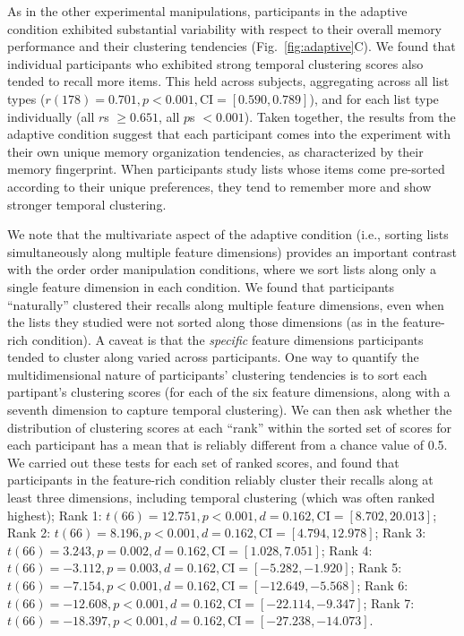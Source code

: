 \documentclass[11pt]{article}
\begin{document}
As in the other experimental manipulations, participants in the adaptive
condition exhibited substantial variability with respect to their overall
memory performance and their clustering tendencies (Fig.~\ref{fig:adaptive}C).
We found that individual participants who exhibited strong temporal clustering
scores also tended to recall more items. This held across subjects, aggregating
across all list types ($r(178) = 0.701, p < 0.001, \mathrm{CI} = [0.590,
0.789]$), and for each list type individually (all $r$s $\geq 0.651$, all $p$s
$< 0.001$). Taken together, the results from the adaptive condition suggest
that each participant comes into the experiment with their own unique memory
organization tendencies, as characterized by their memory fingerprint. When
participants study lists whose items come pre-sorted according to their unique
preferences, they tend to remember more and show stronger temporal clustering.

We note that the multivariate aspect of the adaptive condition (i.e., sorting
lists simultaneously along multiple feature dimensions) provides an important
contrast with the order order manipulation conditions, where we sort lists
along only a single feature dimension in each condition. We found that
participants ``naturally'' clustered their recalls along multiple feature
dimensions, even when the lists they studied were not sorted along those
dimensions (as in the feature-rich condition). A caveat is that the
\textit{specific} feature dimensions participants tended to cluster along
varied across participants. One way to quantify the multidimensional nature of
participants' clustering tendencies is to sort each partipant's clustering
scores (for each of the six feature dimensions, along with a seventh dimension
to capture temporal clustering). We can then ask whether the distribution of
clustering scores at each ``rank'' within the sorted set of scores for each
participant has a mean that is reliably different from a chance value of 0.5.
We carried out these tests for each set of ranked scores, and found that
participants in the feature-rich condition reliably cluster their recalls along
at least three dimensions, including temporal clustering (which was often
ranked highest); Rank 1: $t(66) = 12.751, p < 0.001, d = 0.162, \mathrm{CI} =
[8.702, 20.013]$; Rank 2: $t(66) = 8.196, p < 0.001, d = 0.162, \mathrm{CI} =
[4.794, 12.978]$; Rank 3: $t(66) = 3.243, p = 0.002, d = 0.162, \mathrm{CI} =
[1.028, 7.051]$; Rank 4: $t(66) = -3.112, p = 0.003, d = 0.162, \mathrm{CI} =
[-5.282, -1.920]$; Rank 5: $t(66) = -7.154, p < 0.001, d = 0.162, \mathrm{CI} =
[-12.649, -5.568]$; Rank 6: $t(66) = -12.608, p < 0.001, d = 0.162, \mathrm{CI}
= [-22.114, -9.347]$; Rank 7: $t(66) = -18.397, p < 0.001, d = 0.162,
\mathrm{CI} = [-27.238, -14.073]$.
\end{document}
